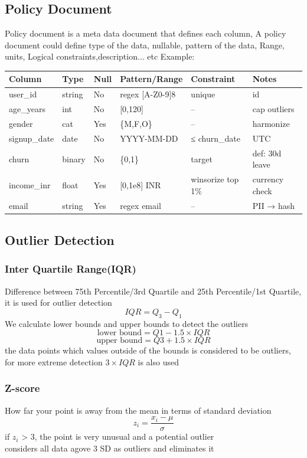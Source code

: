 \documentclass[12pt]{extarticle}
\begin{document}
\subsection{Policy Document}
Policy document is a meta data document that defines each column,
A policy document could define type of the data, nullable, pattern of the data,
Range, units, Logical constraints,description... etc
Example:\\
\begin{tabular}{|l|l|l|l|l|l|}
\hline
Column       & Type    & Null & Pattern/Range   & Constraint         & Notes \\ \hline
user\_id     & string  & No   & regex [A-Z0-9]{8} & unique           & id \\ \hline
age\_years   & int     & No   & [0,120]         & --                & cap outliers \\ \hline
gender       & cat     & Yes  & \{M,F,O\}       & --                & harmonize \\ \hline
signup\_date & date    & No   & YYYY-MM-DD      & ≤ churn\_date     & UTC \\ \hline
churn        & binary  & No   & \{0,1\}         & target            & def: 30d leave \\ \hline
income\_inr  & float   & Yes  & [0,1e8] INR     & winsorize top 1\% & currency check \\ \hline
email        & string  & Yes  & regex email     & --                & PII → hash \\ \hline
\end{tabular}

\subsection{Outlier Detection}

\subsubsection{Inter Quartile Range(IQR)}
Difference between 75th Percentile/3rd Quartile and 25th Percentile/1st Quartile, 
it is used for outlier detection 
$$IQR = Q_3 - Q_1$$ 
We calculate lower bounds and upper bounds to detect the outliers
$$ \text{lower bound}= Q1-1.5 \times IQR$$
$$ \text{upper bound}= Q3+1.5 \times IQR$$
the data points which values outside of the bounds is considered to be outliers, for more extreme detection \(3 \times IQR\) is also used

\subsubsection{Z-score}
How far your point is away from the mean in terms of standard deviation
$$ z_i = \frac{x_i - \mu}{\sigma}   $$
if $z_i$ > 3, the point is very unusual and a potential outlier \\
considers all data agove 3 SD as outliers and eliminates it
\end{document}
